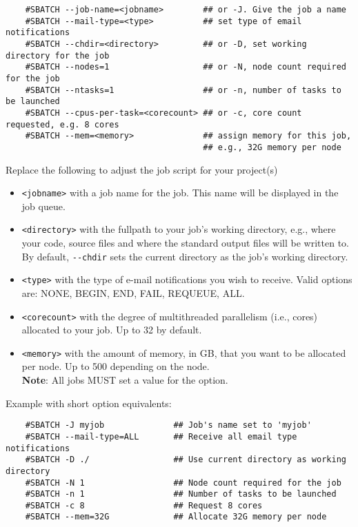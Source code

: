 \small
\begin{verbatim}
    #SBATCH --job-name=<jobname>        ## or -J. Give the job a name
    #SBATCH --mail-type=<type>          ## set type of email notifications
    #SBATCH --chdir=<directory>         ## or -D, set working directory for the job
    #SBATCH --nodes=1                   ## or -N, node count required for the job
    #SBATCH --ntasks=1                  ## or -n, number of tasks to be launched
    #SBATCH --cpus-per-task=<corecount> ## or -c, core count requested, e.g. 8 cores
    #SBATCH --mem=<memory>              ## assign memory for this job,
                                        ## e.g., 32G memory per node
\end{verbatim}
\normalsize

\noindent Replace the following to adjust the job script for your project(s)
\begin{itemize}
    \item \verb+<jobname>+ with a job name for the job. This name will be displayed in the job queue.
    \item \verb+<directory>+ with the fullpath to your job's working directory, e.g., where your code,
    source files and where the standard output files will be written to.
    By default, \verb+--chdir+ sets the current directory as the job's working directory.
    \item \verb+<type>+ with the type of e-mail notifications you wish to receive.
    Valid options are: NONE, BEGIN, END, FAIL, REQUEUE, ALL.
    \item \verb+<corecount>+ with the degree of multithreaded parallelism (i.e., cores) allocated to your job. Up to 32 by default.
    \item \verb+<memory>+ with the amount of memory, in GB, that you want to be allocated per node. Up to 500 depending on the node.\\
    \textbf{Note}: All jobs MUST set a value for the  option.
\end{itemize}

\noindent Example with short option equivalents:
\small
\begin{verbatim}
    #SBATCH -J myjob              ## Job's name set to 'myjob'
    #SBATCH --mail-type=ALL       ## Receive all email type notifications
    #SBATCH -D ./                 ## Use current directory as working directory
    #SBATCH -N 1                  ## Node count required for the job
    #SBATCH -n 1                  ## Number of tasks to be launched
    #SBATCH -c 8                  ## Request 8 cores
    #SBATCH --mem=32G             ## Allocate 32G memory per node
\end{verbatim}
\normalsize

